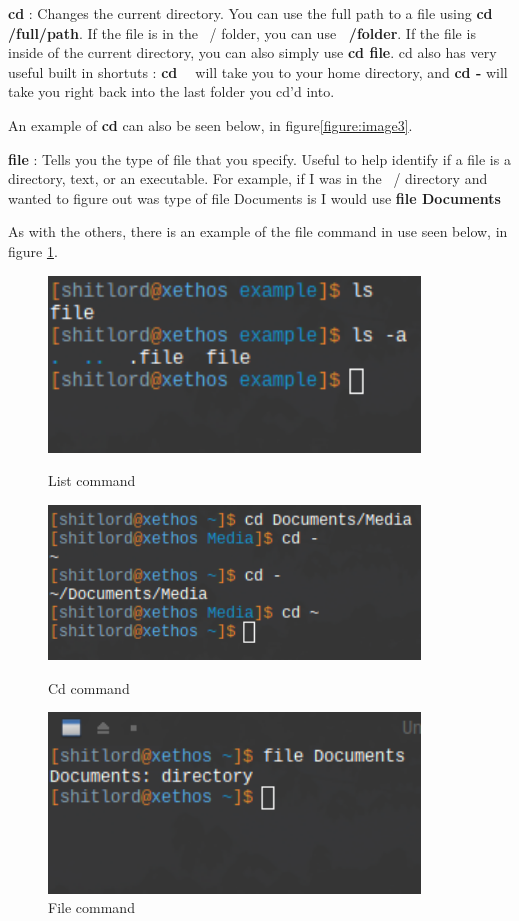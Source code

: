 \documentclass[12pt, letterpaper, twoside]{article}
\begin{document}
\textbf{cd} : Changes the current directory. You can use the full path to a file using \textbf{cd /full/path}. If the file is in the ~/ folder, you can use \textbf{~/folder}. If the file is inside of the current directory, you can also simply use \textbf{cd file}. cd also has very useful built in shortuts : \textbf{cd ~} will take you to your home directory, and \textbf{cd -} will take you right back into the last folder you cd'd into.  

An example of \textbf{cd} can also be seen below, in figure\ref{figure:image3}.

\textbf{file} : Tells you the type of file that you specify. Useful to help identify if a file is a directory, text, or an executable. For example, if I was in the ~/ directory and wanted to figure out was type of file Documents is I would use \textbf{file Documents}

As with the others, there is an example of the file command in use seen below, in figure \ref{figure:image4}.

\begin{figure}[!htb]
  \includegraphics[width=0.88\textwidth]{listfile}
  \caption{List command}\label{figure:image2}
\endminipage\hfill
{}
  \includegraphics[width=0.88\textwidth]{cddemo}
  \caption{Cd command}\label{figure:image3}
\endminipage\hfill
{}%
  \includegraphics[width=0.88\textwidth]{filecmd}
  \caption{File command}\label{figure:image4}
\endminipage
\end{figure}
\end{document}
